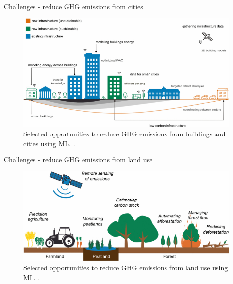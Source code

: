 \documentclass[xcolor={usenames,dvipsnames},handout]{beamer}
\begin{document}
\begin{frame}{Challenges - reduce GHG emissions from cities}
\begin{figure}
\centering
\includegraphics[width=0.8\linewidth]{smart_city}
\caption{Selected opportunities to reduce GHG emissions from buildings and cities using ML.   {\tiny\href{https://dl.acm.org/doi/full/10.1145/3485128}{}}.}
\end{figure}
\end{frame}

\begin{frame}{Challenges - reduce GHG emissions from land use}
\begin{figure}
\centering
\includegraphics[width=0.8\linewidth]{smart_agr}
\caption{Selected opportunities to reduce GHG emissions from land use using ML.  {\tiny\href{https://dl.acm.org/doi/full/10.1145/3485128}{}}.}
\end{figure}
\end{frame}
\end{document}
